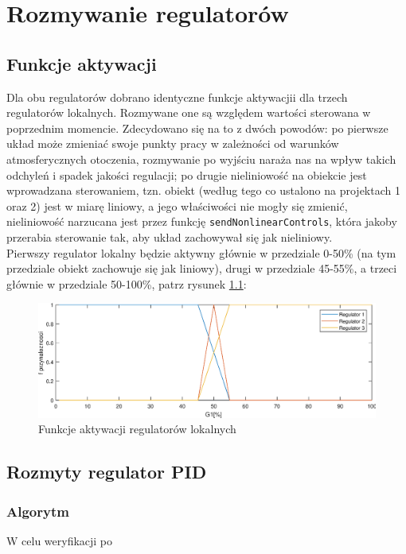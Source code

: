 \chapter{Rozmywanie regulatorów}

\section{Funkcje aktywacji}

Dla obu regulatorów dobrano identyczne funkcje aktywacjii dla trzech regulatorów lokalnych. Rozmywane one są względem wartości sterowana w poprzednim momencie. Zdecydowano się na to z dwóch powodów: po pierwsze układ może zmieniać swoje punkty pracy w zależności od warunków atmosferycznych otoczenia, rozmywanie po wyjściu naraża nas na wpływ takich odchyleń i spadek jakości regulacji; po drugie nieliniowość na obiekcie jest wprowadzana sterowaniem, tzn. obiekt (według tego co ustalono na projektach 1 oraz 2) jest w miarę liniowy, a jego właściwości nie mogły się zmienić, nieliniowość narzucana jest przez funkcję \verb|sendNonlinearControls|, która jakoby przerabia sterowanie tak, aby układ zachowywał się jak nieliniowy. \\

Pierwszy regulator lokalny będzie aktywny głównie w przedziale 0-50\% (na tym przedziale obiekt zachowuje się jak liniowy), drugi w przedziale 45-55\%, a trzeci głównie w przedziale 50-100\%, patrz rysunek \ref{fun_przyn}:

\begin{figure}[h!]
	\centering
	\includegraphics[scale=0.75]{Rys/Przynaleznosc.eps}
	\caption{Funkcje aktywacji regulatorów lokalnych}
	\label{fun_przyn}
\end{figure}

\FloatBarrier

\section {Rozmyty regulator PID}

\subsection{Algorytm}

W celu weryfikacji po